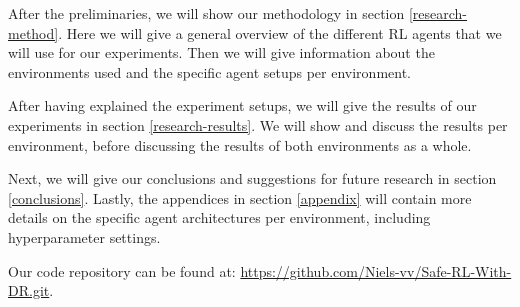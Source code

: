 After the preliminaries, we will show our methodology in section \ref{research-method}. Here we will give a general overview of the different RL agents that we will use for our experiments. Then we will give information about the environments used and the specific agent setups per environment. 

After having explained the experiment setups, we will give the results of our experiments in section \ref{research-results}. We will show and discuss the results per environment, before discussing the results of both environments as a whole.

Next, we will give our conclusions and suggestions for future research in section \ref{conclusions}. Lastly, the appendices in section \ref{appendix} will contain more details on the specific agent architectures per environment, including hyperparameter settings.

Our code repository can be found at: \url{https://github.com/Niels-vv/Safe-RL-With-DR.git}.